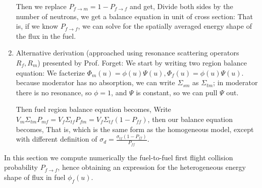 \documentclass{school-22.211-notes}
\begin{document}
\begin{enumerate}
Then we replace $P_{f\to m} = 1 - P_{f\to f}$ and get, 
Divide both sides by the number of neutrons, we get a balance equation in unit of cross section:
That is, if we know $P_{f\to f}$, we can solve for the spatially averaged energy shape of the flux in the fuel. 


\item Alternative derivation (approached using resonance scattering operators $R_f, R_m$) presented by Prof. Forget: We start by writing two region balance equation: 
We facterize $\Phi_m(u) = \phi(u) \Psi(u), \Phi_f (u) = \phi(u) \Psi(u)$. 
because moderator has no absorption, we can write $\Sigma_{sm}$ as $\Sigma_{tm}$; in moderator there is no resonance, so $\phi = 1$, and $\Psi$ is constant, so we can pull $\Psi$ out. 

Then fuel region balance equation becomes,
Write $V_m \Sigma_{tm} P_{mf} = V_f \Sigma_{tf} P_{fm} = V_f \Sigma_{tf} (1- P_{ff})$, then our balance equation becomes, 
That is, 
which is the same form as the homogeneous model, except with  different definition of $\sigma_d = \frac{\sigma_{tf} (1 - P_{ff})}{P_{ff}}$. 
\end{enumerate}


In this section we compute numerically the fuel-to-fuel first flight collision probability $P_{f\to f}$, hence obtaining an expression for the heterogeneous energy shape of flux in fuel $\phi_f(u)$. 
\end{document}
